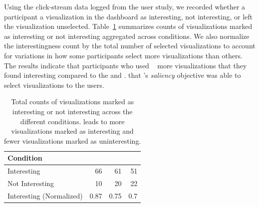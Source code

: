 \npar Using the click-stream data logged from the user study, we recorded whether a
participant  a visualization in the dashboard as interesting, not interesting, or left the visualization unselected. Table~\ref{table:interestingScore} summarizes counts of visualizations marked as interesting or not interesting aggregated across conditions. We also normalize the interestingness count by the total number of selected visualizations to account for variations in how some participants select more visualizations than others. The results indicate that participants who used \system\  more visualizations that they found interesting compared to the \BFS and \cluster {}.  that \system's \textit{saliency} objective was able to select visualizations  to the users.
\begin{table}[h!]
	\centering
	\begin{tabular}{|l|rrr|}
	\hline
	 \small{Condition}             &   \small{\system} &   \small{\BFS} &   \small{\cluster} \\
	\hline
	 \small{Interesting}            &  \cellcolor{blue!25}       66    & 61    &      51   \\
	 \small{Not Interesting}        &  \cellcolor{blue!25}       10    & 20    &      22   \\
	 \small{Interesting (Normalized)} &   \cellcolor{blue!25}       0.87 &  0.75 &       0.7 \\
	\hline
	\end{tabular}
	\caption{Total counts of visualizations marked as interesting or not interesting across the different conditions. \system leads to more visualizations marked as interesting and fewer visualizations marked as uninteresting.}
	\label{table:interestingScore}
\end{table}
